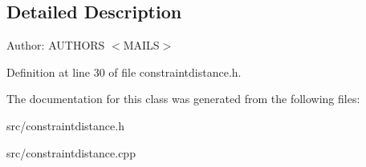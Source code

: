 \subsection{Detailed Description}
\begin{Desc}
\item[Author:]AUTHORS $<$MAILS$>$ \end{Desc}


Definition at line 30 of file constraintdistance.h.

The documentation for this class was generated from the following files:\begin{CompactItemize}
\item 
src/constraintdistance.h\item 
src/constraintdistance.cpp\end{CompactItemize}

